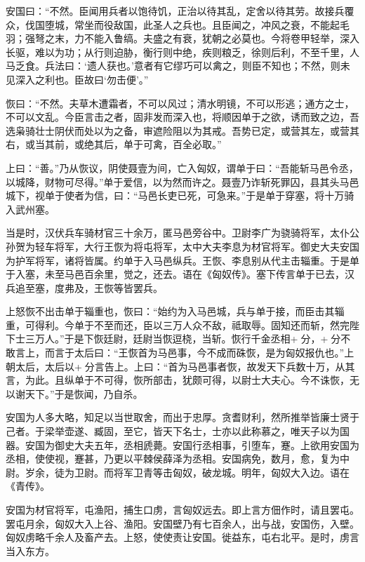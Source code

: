 \documentclass[12pt,UTF8]{ctexbook}
\begin{document}
安国曰：“不然。臣闻用兵者以饱待饥，正治以待其乱，定舍以待其劳。故接兵覆众，伐国堕城，常坐而役敌国，此圣人之兵也。且臣闻之，冲风之衰，不能起毛羽；强弩之末，力不能入鲁缟。夫盛之有衰，犹朝之必莫也。今将卷甲轻举，深入长驱，难以为功；从行则迫胁，衡行则中绝，疾则粮乏，徐则后利，不至千里，人马乏食。兵法曰：‘遗人获也。’意者有它缪巧可以禽之，则臣不知也；不然，则未见深入之利也。臣故曰‘勿击便’。”



恢曰：“不然。夫草木遭霜者，不可以风过；清水明镜，不可以形逃；通方之士，不可以文乱。今臣言击之者，固非发而深入也，将顺因单于之欲，诱而致之边，吾选枭骑壮士阴伏而处以为之备，审遮险阻以为其戒。吾势已定，或营其左，或营其右，或当其前，或绝其后，单于可禽，百全必取。”



上曰：“善。”乃从恢议，阴使聂壹为间，亡入匈奴，谓单于曰：“吾能斩马邑令丞，以城降，财物可尽得。”单于爱信，以为然而许之。聂壹乃诈斩死罪囚，县其头马邑城下，视单于使者为信，曰：“马邑长吏已死，可急来。”于是单于穿塞，将十万骑入武州塞。



当是时，汉伏兵车骑材官三十余万，匿马邑旁谷中。卫尉李广为骁骑将军，太仆公孙贺为轻车将军，大行王恢为将屯将军，太中大夫李息为材官将军。御史大夫安国为护军将军，诸将皆属。约单于入马邑纵兵。王恢、李息别从代主击辎重。于是单于入塞，未至马邑百余里，觉之，还去。语在《匈奴传》。塞下传言单于已去，汉兵追至塞，度弗及，王恢等皆罢兵。



上怒恢不出击单于辎重也，恢曰：“始约为入马邑城，兵与单于接，而臣击其辎重，可得利。今单于不至而还，臣以三万人众不敌，祗取辱。固知还而斩，然完陛下士三万人。”于是下恢廷尉，廷尉当恢逗桡，当斩。恢行千金丞相+分，+分不敢言上，而言于太后曰：“王恢首为马邑事，今不成而硃恢，是为匈奴报仇也。”上朝太后，太后以+分言告上。上曰：“首为马邑事者恢，故发天下兵数十万，从其言，为此。且纵单于不可得，恢所部击，犹颇可得，以尉士大夫心。今不诛恢，无以谢天下。”于是恢闻，乃自杀。



安国为人多大略，知足以当世取舍，而出于忠厚。贪耆财利，然所推举皆廉士贤于己者。于梁举壶遂、臧固，至它，皆天下名士，士亦以此称慕之，唯天子以为国器。安国为御史大夫五年，丞相虒薨。安国行丞相事，引堕车，蹇。上欲用安国为丞相，使使视，蹇甚，乃更以平棘侯薛泽为丞相。安国病免，数月，愈，复为中尉。岁余，徒为卫尉。而将军卫青等击匈奴，破龙城。明年，匈奴大入边。语在《青传》。



安国为材官将军，屯渔阳，捕生口虏，言匈奴远去。即上言方佃作时，请且罢屯。罢屯月余，匈奴大入上谷、渔阳。安国壁乃有七百余人，出与战，安国伤，入壁。匈奴虏略千余人及畜产去。上怒，使使责让安国。徙益东，屯右北平。是时，虏言当入东方。
\end{document}
